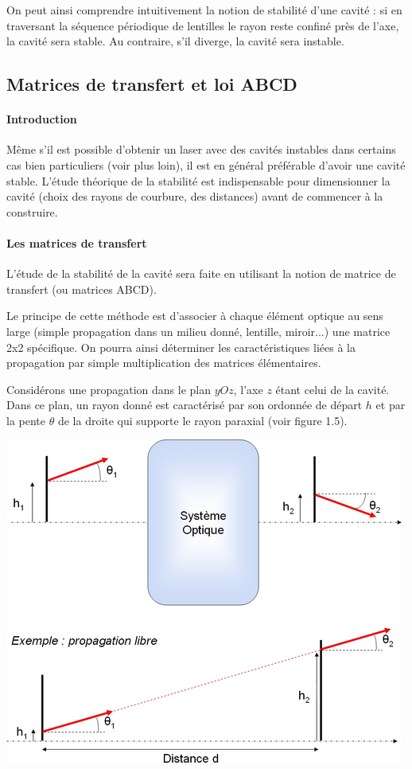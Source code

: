 \documentclass{book}
\begin{document}
On peut ainsi comprendre intuitivement la notion de stabilité d'une cavité : si en traversant la séquence périodique de lentilles le rayon reste confiné près de l'axe, la cavité sera stable. Au contraire, s'il diverge, la cavité sera instable.

\subsection{Matrices de transfert et loi ABCD}
\paragraph{Introduction}
Même s'il est possible d'obtenir un laser avec des cavités instables dans certains cas bien particuliers (voir plus loin), il est en général préférable d'avoir une cavité stable. L'étude théorique de la stabilité est indispensable pour dimensionner la cavité (choix des rayons de courbure, des distances) avant de commencer à la construire. 
\paragraph{Les matrices de transfert}
L'étude de la stabilité de la cavité sera faite en utilisant la notion de matrice de transfert (ou matrices ABCD).

Le principe de cette méthode est d'associer à chaque élément optique au sens large (simple propagation dans un milieu donné, lentille, miroir...) une matrice 2x2 spécifique. On pourra ainsi déterminer les caractéristiques liées à la propagation par simple multiplication des matrices élémentaires.

Considérons une propagation dans le plan $yOz$, l'axe $z$ étant celui de la cavité. Dans ce plan, un rayon donné est caractérisé par son ordonnée de départ $h$ et par la pente $\theta$ de la droite qui supporte le rayon paraxial (voir figure 1.5). 

{\centering
\includegraphics[scale=1.7]{images/fig05.jpg}
\par}
\end{document}
